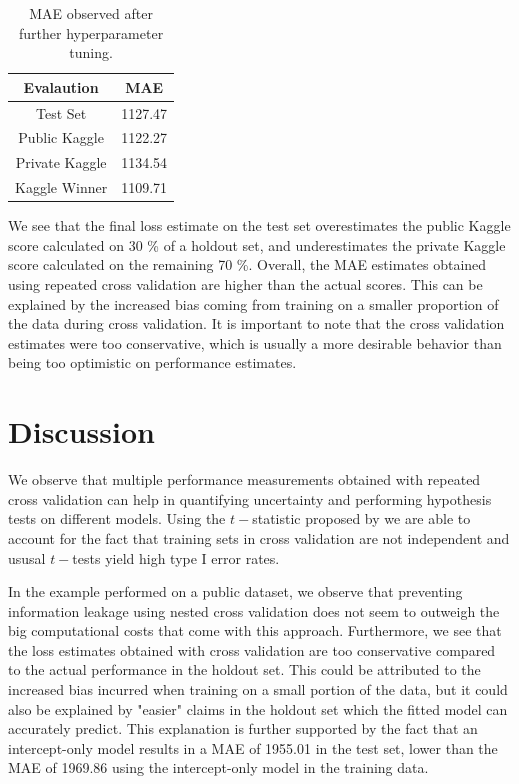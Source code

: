 \documentclass[11pt,a4paper]{article}
\theoremstyle{plain}
\theoremstyle{definition}
\begin{document}
\begin{table}[ht]
\centering
\begin{tabular}{|c|c|}
\hline
Evalaution & MAE\\
\hline
Test Set & 1127.47\\
Public Kaggle & 1122.27\\
Private Kaggle & 1134.54\\
Kaggle Winner & 1109.71\\
\hline
\end{tabular}
\caption{MAE observed after further hyperparameter tuning.}
\label{tbl:results}
\end{table}

We see that the final loss estimate on the test set overestimates the public Kaggle score calculated on 30 \% of a holdout set, and underestimates the private Kaggle score calculated on the remaining 70 \%. Overall, the MAE estimates obtained using repeated cross validation are higher than the actual scores. This can be explained by the increased bias coming from training on a smaller proportion of the data during cross validation. It is important to note that the cross validation estimates were too conservative, which is usually a more desirable behavior than being too optimistic on performance estimates.

\section{Discussion}
\label{sec:discussion}

We observe that multiple performance measurements obtained with repeated cross validation can help in quantifying uncertainty and performing hypothesis tests on different models. Using the $t-$statistic proposed by \citet{ttest} we are able to account for the fact that training sets in cross validation are not independent and ususal $t-$tests yield high type I error rates.

In the example performed on a public dataset, we observe that preventing information leakage using nested cross validation does not seem to outweigh the big computational costs that come with this approach. Furthermore, we see that the loss estimates obtained with cross validation are too conservative compared to the actual performance in the holdout set. This could be attributed to the increased bias incurred when training on a small portion of the data, but it could also be explained by "easier" claims in the holdout set which the fitted model can accurately predict. This explanation is further supported by the fact that an intercept-only model results in a MAE of 1955.01 in the test set, lower than the MAE of 1969.86 using the intercept-only model in the training data.
\end{document}
